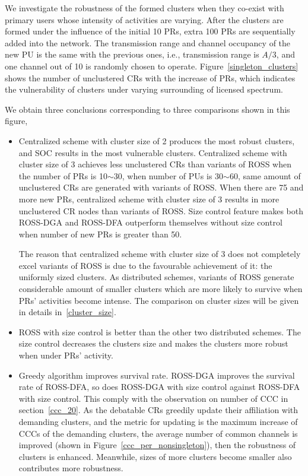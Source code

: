 \documentclass[journal,comsoc]{IEEEtran}
\theoremstyle{mytheoremstyle}
\theoremstyle{mytheoremstyle}
\theoremstyle{mytheoremstyle}
\newcommand{\ie}{i.e., }
\begin{document}
We investigate the robustness of the formed clusters when they co-exist with primary users whose intensity of activities are varying.
After the clusters are formed under the influence of the initial 10 PRs, extra 100 PRs are sequentially added into the network.
The transmission range and channel occupancy of the new PU is the same with the previous ones, \ie transmission range is $A/3$, and one channel out of 10 is randomly chosen to operate.
%
Figure~\ref{singleton_clusters} shows the number of unclustered CRs with the increase of PRs, which indicates the vulnerability of clusters under varying surrounding of licensed spectrum.


We obtain three conclusions corresponding to three comparisons shown in this figure,
\begin{itemize}
\item Centralized scheme with cluster size of 2 produces the most robust clusters, and SOC results in the most vulnerable clusters.
Centralized scheme with cluster size of 3 achieves less unclustered CRs than variants of ROSS when the number of PRs is 10$\sim$30, when number of PUs is 30$\sim$60, same amount of unclustered CRs are generated with variants of ROSS.
When there are 75 and more new PRs, centralized scheme with cluster size of 3 results in more unclustered CR nodes than variants of ROSS.
Size control feature makes both ROSS-DGA and ROSS-DFA outperform themselves without size control when number of new PRs is greater than 50.

The reason that centralized scheme with cluster size of 3 does not completely excel variants of ROSS is due to the favourable achievement of it: the uniformly sized clusters.
As distributed schemes, variants of ROSS generate considerable amount of smaller clusters which are more likely to survive when PRs' activities become intense.
The comparison on cluster sizes will be given in details in~\ref{cluster_size}.

\item ROSS with size control is better than the other two distributed schemes.
The size control decreases the clusters size and makes the clusters more robust when under PRs' activity.

\item Greedy algorithm improves survival rate. 
ROSS-DGA improves the survival rate of ROSS-DFA, so does ROSS-DGA with size control against ROSS-DFA with size control.
This comply with the observation on number of CCC in section~\ref{ccc_20}.
As the debatable CRs greedily update their affiliation with demanding clusters, and the metric for updating is the maximum increase of CCCs of the demanding clusters, the average number of common channels is improved (shown in Figure~\ref{ccc_per_nonsingleton}), then the robustness of clusters is enhanced. 
Meanwhile, sizes of more clusters become smaller also contributes more robustness.

\end{itemize}
\end{document}

